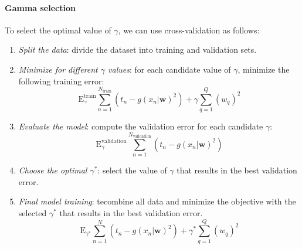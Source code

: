 \paragraph*{Gamma selection}
To select the optimal value of $\gamma$, we can use cross-validation as follows:
\begin{enumerate}
    \item \textit{Split the data}: divide the dataset into training and validation sets.
    \item \textit{Minimize for different $\gamma$ values}: for each candidate value of $\gamma$, minimize the following training error:
        \[\text{E}_{\gamma}^{\text{train}}\sum_{n=1}^{N_{\text{train}}}(t_n-g(x_n|\mathbf{w})^2)+\gamma\sum_{q=1}^Q(w_q)^2\]
    \item \textit{Evaluate the model}: compute the validation error for each candidate $\gamma$:
        \[\text{E}_{\gamma}^{\text{validation}}\sum_{n=1}^{N_{\text{validation}}}(t_n-g(x_n|\mathbf{w})^2)\]
    \item \textit{Choose the optimal $\gamma^\ast$}: select the value of $\gamma$ that results in the best validation error.
    \item \textit{Final model training}: tecombine all data and minimize the objective with the selected $\gamma^\ast$ that results in the best validation error.
        \[\text{E}_{\gamma^\ast}\sum_{n=1}^{N}(t_n-g(x_n|\mathbf{w})^2)+\gamma^\ast\sum_{q=1}^Q(w_q)^2\]
\end{enumerate}


